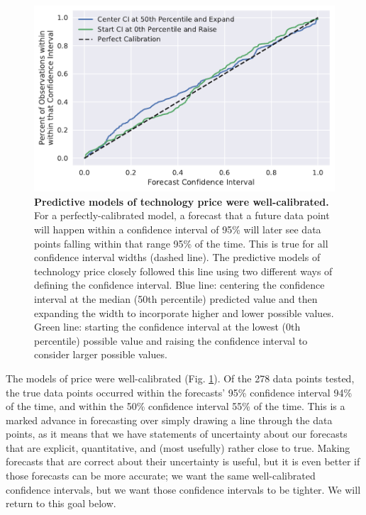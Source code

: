 \documentclass{article}
\begin{document}
\begin{figure}
    \centering
    \includegraphics[width=.75\textwidth]{figs/Forecast_Calibration_Price.pdf}
    \caption{\textbf{Predictive models of technology price were well-calibrated.} For a perfectly-calibrated model, a forecast that a future data point will happen within a confidence interval of 95\% will later see data points falling within that range 95\% of the time. This is true for all confidence interval widths (dashed line). The predictive models of technology price closely followed this line using two different ways of defining the confidence interval. Blue line: centering the confidence interval at the median (50th percentile) predicted value and then expanding the width to incorporate higher and lower possible values. Green line: starting the confidence interval at the lowest (0th percentile) possible value and raising the confidence interval to consider larger possible values.}
    \label{Forecast_Calibration_Price}
\end{figure}

The models of price were well-calibrated (Fig. \ref{Forecast_Calibration_Price}). Of the 278 data points tested, the true data points occurred within the forecasts' 95\% confidence interval 94\% of the time, and within the 50\% confidence interval 55\% of the time. This is a marked advance in forecasting over simply drawing a line through the data points, as it means that we have statements of uncertainty about our forecasts that are explicit, quantitative, and (most usefully) rather close to true. Making forecasts that are correct about their uncertainty is useful, but it is even better if those forecasts can be more accurate; we want the same well-calibrated confidence intervals, but we want those confidence intervals to be tighter. We will return to this goal below.
\end{document}
